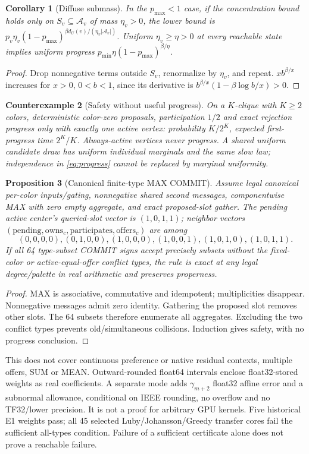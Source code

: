 \documentclass[10pt]{article}
\newtheorem{proposition}{Proposition}
\newtheorem{corollary}[proposition]{Corollary}
\newtheorem{example}[proposition]{Counterexample}
\newcommand{\A}{\mathcal A}
\begin{document}
\begin{corollary}[Diffuse submass]
In the $p_{\max}<1$ case, if the concentration bound holds only on $S_v\subseteq\A_v$ of mass
$\eta_v>0$, the lower bound is
$p_v\eta_v(1-p_{\max})^{\beta d_U(v)/(\eta_v|\A_v|)}$.
Uniform $\eta_v\ge\eta>0$ at every reachable state implies uniform progress
$p_{\min}\eta(1-p_{\max})^{\beta/\eta}$.
\end{corollary}
\begin{proof}
Drop nonnegative terms outside $S_v$, renormalize by $\eta_v$, and repeat.
$x b^{\beta/x}$ increases for $x>0$, $0<b<1$, since its derivative is
$b^{\beta/x}(1-\beta\log b/x)>0$.
\end{proof}
\begin{example}[Safety without useful progress]\label{ex:stalled}
On a $K$-clique with $K\ge2$ colors, deterministic color-zero proposals,
participation $1/2$ and exact rejection progress only with exactly one active
vertex: probability $K/2^K$, expected first-progress time $2^K/K$.
Always-active vertices never progress. A shared uniform candidate draw has
uniform individual marginals and the same slow law; independence in
\eqref{eq:progress} cannot be replaced by marginal uniformity.
\end{example}

\begin{proposition}[Canonical finite-type MAX COMMIT]\label{prop:max}
Assume legal canonical per-color inputs/gating, nonnegative shared second
messages, componentwise MAX with zero empty aggregate, and exact proposed-slot
gather. The pending active center's queried-slot vector is $(1,0,1,1)$;
neighbor vectors $(\text{pending},\text{owns}_c,\text{participates},\text{offers}_c)$
are among
\[
(0,0,0,0),(0,1,0,0),(1,0,0,0),(1,0,0,1),(1,0,1,0),(1,0,1,1).
\]
If all 64 type-subset COMMIT signs accept precisely subsets without the
fixed-color or active-equal-offer conflict types, the rule is exact at any
legal degree/palette in real arithmetic and preserves properness.
\end{proposition}
\begin{proof}
MAX is associative, commutative and idempotent; multiplicities disappear.
Nonnegative messages admit zero identity. Gathering the proposed slot
removes other slots. The 64 subsets therefore enumerate all aggregates.
Excluding the two conflict types prevents old/simultaneous collisions.
Induction gives safety, with no progress conclusion.
\end{proof}
This does not cover continuous preference or native residual contexts,
multiple offers, SUM or MEAN. Outward-rounded float64 intervals enclose
float32-stored weights as real coefficients. A separate mode adds
$\gamma_{m+2}$ float32 affine error and a subnormal allowance, conditional
on IEEE rounding, no overflow and no TF32/lower precision. It is not a proof
for arbitrary GPU kernels. Five historical E1 weights pass; all 45 selected
Luby/Johansson/Greedy transfer cores fail the sufficient all-types condition.
Failure of a sufficient certificate alone does not prove a reachable failure.
\end{document}
